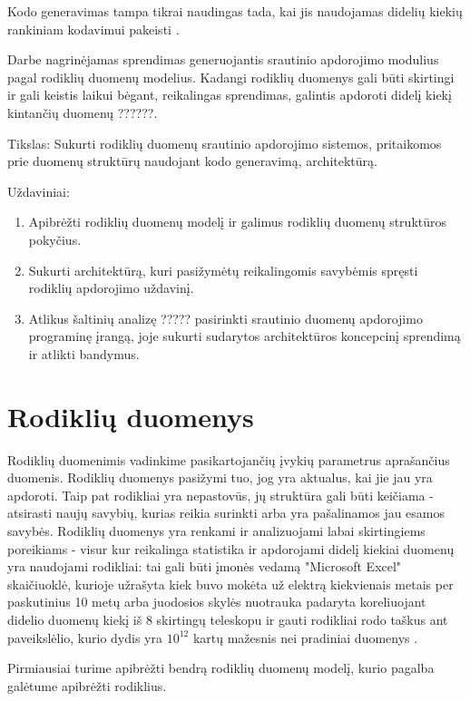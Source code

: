 \documentclass{VUMIFPSbakalaurinis}
\begin{document}
Kodo generavimas tampa tikrai naudingas tada, kai jis naudojamas didelių kiekių rankiniam kodavimui pakeisti \cite{herrington2003code}. \par
Darbe nagrinėjamas sprendimas generuojantis srautinio apdorojimo modulius pagal rodiklių duomenų modelius. Kadangi rodiklių duomenys gali būti skirtingi ir gali keistis laikui bėgant, reikalingas sprendimas, galintis apdoroti didelį kiekį kintančių duomenų ??????.  

Tikslas: Sukurti rodiklių duomenų srautinio apdorojimo sistemos, pritaikomos prie duomenų struktūrų naudojant kodo generavimą, architektūrą.

Uždaviniai:
\begin{enumerate}
    \item Apibrėžti rodiklių duomenų modelį ir galimus rodiklių duomenų struktūros pokyčius.
    \item Sukurti architektūrą, kuri pasižymėtų reikalingomis savybėmis spręsti rodiklių apdorojimo uždavinį. 
    \item Atlikus šaltinių analizę ????? pasirinkti srautinio duomenų apdorojimo programinę įrangą, joje sukurti sudarytos architektūros koncepcinį sprendimą ir atlikti bandymus.
\end{enumerate}

\section{Rodiklių duomenys}

Rodiklių duomenimis vadinkime pasikartojančių įvykių parametrus aprašančius duomenis. Rodiklių duomenys pasižymi tuo, jog yra aktualus, kai jie jau yra apdoroti. Taip pat rodikliai yra nepastovūs, jų struktūra gali būti keičiama - atsirasti naujų savybių, kurias reikia surinkti arba yra pašalinamos jau esamos savybės. Rodiklių duomenys yra renkami ir analizuojami labai skirtingiems poreikiams - visur kur reikalinga statistika ir apdorojami didelį kiekiai duomenų yra naudojami rodikliai: tai gali būti įmonės vedamą "Microsoft Excel" skaičiuoklė, kurioje užrašyta kiek buvo mokėta už elektrą kiekvienais metais per paskutinius 10 metų arba juodosios skylės nuotrauka padaryta koreliuojant didelio duomenų kiekį iš 8 skirtingų teleskopu ir gauti rodikliai rodo taškus ant paveikslėlio, kurio dydis yra \(10^{12}\) kartų mažesnis nei pradiniai duomenys \cite{akiyama2019first}. \par    
Pirmiausiai turime apibrėžti bendrą rodiklių duomenų modelį, kurio pagalba galėtume apibrėžti rodiklius. 
\end{document}
